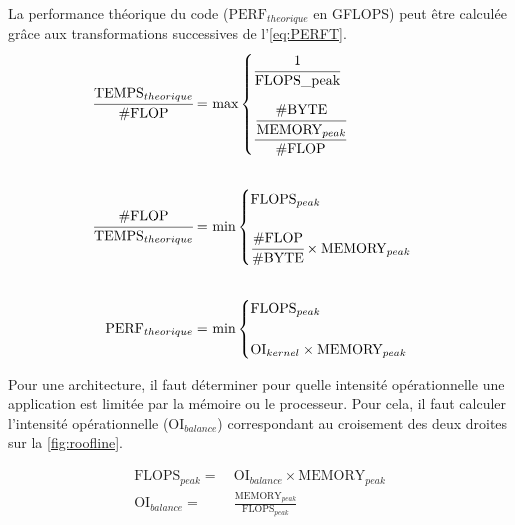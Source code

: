             
            
            
            La performance théorique du code ($\text{PERF}_{theorique}$ en GFLOPS) peut être calculée grâce aux transformations successives de l'\autoref{eq:PERFT}.
            \begin{equation}
            \begin{aligned}
            \label{eq:PERFT}
            \cfrac{\text{TEMPS}_{theorique}}{\text{\#FLOP}}  =\ &\text{max}
            \begin{cases} 
                \cfrac {1}{\text{FLOPS\_{peak}}}    \\[15pt]  
                \cfrac {\cfrac{\text{\#BYTE}}{\text{MEMORY}_{peak}}}{\text{\#FLOP}} 
            \end{cases}\\[20pt]
            \cfrac{\text{\#FLOP}}{\text{TEMPS}_{theorique}}  =\ &\text{min}
            \begin{cases} 
                \text{FLOPS}_{peak}    \\[15pt]  
                \cfrac{\text{\#FLOP}}{\text{\#BYTE}} \times \text{MEMORY}_{peak}
            \end{cases}\\[20pt]
            \text{PERF}_{theorique}  =\ &\text{min}
            \begin{cases} 
                \text{FLOPS}_{peak}    \\[15pt]  
                \text{OI}_{kernel} \times \text{MEMORY}_{peak} 
            \end{cases}
            \end{aligned}
            \end{equation}
            
            
            
            Pour une architecture, il faut déterminer pour quelle intensité opérationnelle une application est limitée par la mémoire ou le processeur. Pour cela, il faut calculer l’intensité opérationnelle ($\text{OI}_{balance}$) correspondant au croisement des deux droites sur la \autoref{fig:roofline}. 
            
            \begin{equation}
            \begin{aligned}
             \text{FLOPS}_{peak} =\ &\text{OI}_{balance} \times \text{MEMORY}_{peak} \\[20pt]
             \text{OI}_{balance} =\ &\frac{\text{MEMORY}_{peak}} {\text{FLOPS}_{peak}} 
            \end{aligned}
            \end{equation}
            
